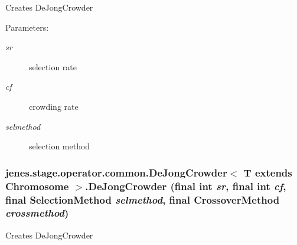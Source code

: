 Creates DeJongCrowder

\begin{Desc}
\item[Parameters:]
\begin{description}
\item[{\em sr}]selection rate \item[{\em cf}]crowding rate \item[{\em selmethod}]selection method \end{description}
\end{Desc}
\hypertarget{classjenes_1_1stage_1_1operator_1_1common_1_1_de_jong_crowder_3_01_t_01extends_01_chromosome_01_4_50f143494ddff28214ac72497b0de52a}{
\subsubsection[DeJongCrowder]{\setlength{\rightskip}{0pt plus 5cm}jenes.stage.operator.common.DeJongCrowder$<$ T extends Chromosome $>$.DeJongCrowder (final int {\em sr}, \/  final int {\em cf}, \/  final {\bf SelectionMethod} {\em selmethod}, \/  final {\bf CrossoverMethod} {\em crossmethod})}}
\label{classjenes_1_1stage_1_1operator_1_1common_1_1_de_jong_crowder_3_01_t_01extends_01_chromosome_01_4_50f143494ddff28214ac72497b0de52a}


Creates DeJongCrowder

